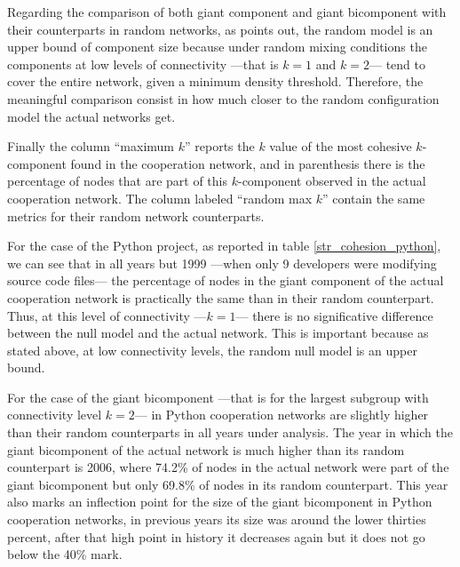 Regarding the comparison of both giant component and giant bicomponent with their counterparts in random networks, as \citet[229-230]{moody:2004} points out, the random model is an upper bound of component size because under random mixing conditions the components at low levels of connectivity ---that is $k = 1$ and $k = 2$--- tend to cover the entire network, given a minimum density threshold. Therefore, the meaningful comparison consist in how much closer to the random configuration model the actual networks get.

Finally the column ``maximum $k$'' reports the $k$ value of the most cohesive $k$-component found in the cooperation network, and in parenthesis there is the percentage of nodes that are part of this $k$-component observed in the actual cooperation network. The column labeled ``random max $k$'' contain the same metrics for their random network counterparts. 

For the case of the Python project, as reported in table \ref{str_cohesion_python}, we can see that in all years but 1999 ---when only 9 developers were modifying source code files--- the percentage of nodes in the giant component of the actual cooperation network is practically the same than in their random counterpart. Thus, at this level of connectivity ---$k = 1$--- there is no significative difference between the null model and the actual network. This is important because as stated above, at low connectivity levels, the random null model is an upper bound.

For the case of the giant bicomponent ---that is for the largest subgroup with connectivity level $k = 2$--- in Python cooperation networks are slightly higher than their random counterparts in all years under analysis. The year in which the giant bicomponent of the actual network is much higher than its random counterpart is 2006, where 74.2\% of nodes in the actual network were part of the giant bicomponent but only 69.8\% of nodes in its random counterpart. This year also marks an inflection point for the size of the giant bicomponent in Python cooperation networks, in previous years its size was around the lower thirties percent, after that high point in history it decreases again but it does not go below the 40\% mark. 


